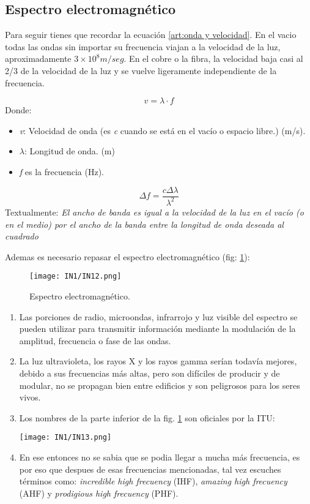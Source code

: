 \documentclass[
	12pt, %
	fleqn, %
	a4paper, %
	oneside, %
]{LegrandOrangeBook}
\begin{document}
\subsection{Espectro electromagnético}
Para seguir tienes que recordar la ecuación \ref{art:onda y velocidad}. En el vacio todas las ondas sin importar su frecuencia viajan a la velocidad de la luz, aproximadamente \textbf{$3\times 10^8m/seg$}. En el cobre o la fibra, la velocidad baja casi al 2/3 de la velocidad de la luz y se vuelve ligeramente independiente de la frecuencia.\\
\begin{definition}
\begin{equation}
\label{eq: onda y velocidad}
v=\lambda\cdot f
\end{equation}
Donde:
\begin{itemize}
\item \textit{v}: Velocidad de onda (es \textit{c} cuando se está en el vacío o espacio libre.) (m/s).
\item $\lambda$: Longitud de onda. (m)
\item \textit{f} es la frecuencia (Hz).
\end{itemize}
\end{definition}
\begin{definition}
\begin{equation}
\Delta f=\frac{c\Delta\lambda}{\lambda^2}
\label{eq: ancho de banda y onda}
\end{equation}
Textualmente: \textit{El ancho de banda es igual a la velocidad de la luz en el vacío (o en el medio) por el ancho de la banda entre la longitud de onda deseada al cuadrado}
\end{definition}
Ademas es necesario repasar el espectro electromagnético (fig: \ref{fig:espectro electro}):
\begin{figure}[]
\centering
\texttt{[image: IN1/IN12.png]}
\caption{Espectro electromagnético.}
\label{fig:espectro electro}
\end{figure}
\begin{enumerate}
\item Las porciones de radio, microondas, infrarrojo y luz visible del espectro se pueden utilizar para transmitir información mediante la modulación de la amplitud, frecuencia o fase de las ondas.
\item La luz ultravioleta, los rayos X y los rayos gamma serían todavía mejores, debido a sus frecuencias más altas, pero son difíciles de producir y de modular, no se propagan bien entre edificios y son peligrosos para los seres vivos.
\item Los nombres de la parte inferior de la fig. \ref{fig:espectro electro} son oficiales por la ITU:
\begin{center}
\texttt{[image: IN1/IN13.png]}
\end{center}
\item En ese entonces no se sabia que se podia llegar a mucha más frecuencia, es por eso que despues de esas frecuencias mencionadas, tal vez escuches términos como: \textit{incredible high frecuency} (IHF), \textit{amazing high frecuency} (AHF) y \textit{prodigious high frecuency} (PHF).
\end{enumerate}
\end{document}
